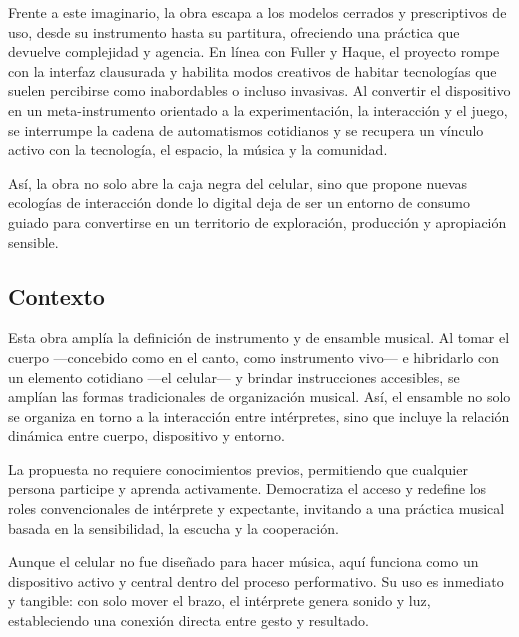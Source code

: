 \documentclass[spanish]{report}
\begin{document}
Frente a este imaginario, la obra escapa a los modelos cerrados y prescriptivos de uso, desde su instrumento hasta su partitura, ofreciendo una práctica que devuelve complejidad y agencia. En línea con Fuller y Haque, el proyecto rompe con la interfaz clausurada y habilita modos creativos de habitar tecnologías que suelen percibirse como inabordables o incluso invasivas. Al convertir el dispositivo en un meta-instrumento orientado a la experimentación, la interacción y el juego, se interrumpe la cadena de automatismos cotidianos y se recupera un vínculo activo con la tecnología, el espacio, la música y la comunidad.

Así, la obra no solo abre la caja negra del celular, sino que propone nuevas ecologías de interacción donde lo digital deja de ser un entorno de consumo guiado para convertirse en un territorio de exploración, producción y apropiación sensible.


\subsection{Contexto}
Esta obra amplía la definición de instrumento y de ensamble musical. Al tomar el cuerpo —concebido como en el canto, como instrumento vivo— e hibridarlo con un elemento cotidiano —el celular— y brindar instrucciones accesibles, se amplían las formas tradicionales de organización musical. Así, el ensamble no solo se organiza en torno a la interacción entre intérpretes, sino que incluye la relación dinámica entre cuerpo, dispositivo y entorno.

La propuesta no requiere conocimientos previos, permitiendo que cualquier persona participe y aprenda activamente. Democratiza el acceso y redefine los roles convencionales de intérprete y expectante, invitando a una práctica musical basada en la sensibilidad, la escucha y la cooperación.

Aunque el celular no fue diseñado para hacer música, aquí funciona como un dispositivo activo y central dentro del proceso performativo. Su uso es inmediato y tangible: con solo mover el brazo, el intérprete genera sonido y luz, estableciendo una conexión directa entre gesto y resultado.
\end{document}
